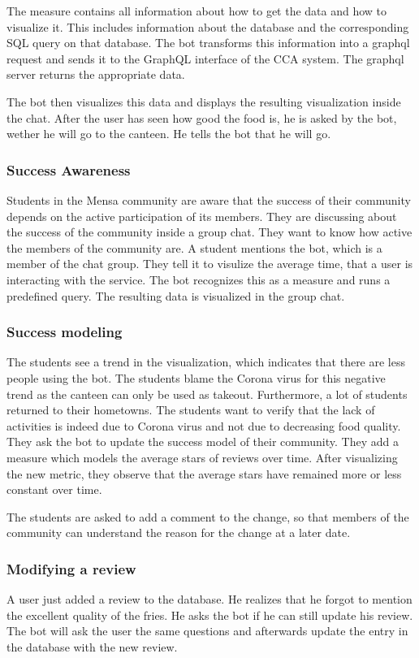 The measure contains all information about how to get the data and how to visualize it. This includes information about the database and the corresponding SQL query on that database. The bot transforms this information into a graphql request and sends it to the GraphQL interface of the CCA system. The graphql server returns the appropriate data.

The bot then visualizes this data and displays the  resulting visualization inside the chat.
After the user has seen how good the food is, he is asked by the bot, wether he will go to the canteen. He tells the bot that he will go.

\subsubsection{Success Awareness} Students in the Mensa community are aware that the success of their community depends on the active participation of its members. They are discussing about the success of the community inside a group chat. They want to know how active the members of the community are. A student mentions the bot, which is a member of the chat group. They tell it to visulize the average time, that a user is interacting with the service. The bot recognizes this as a measure and runs a predefined query. The resulting data is visualized in the group chat.

\subsubsection{Success modeling} The students see a trend in the visualization, which indicates that there are less people using the bot.
The students blame the Corona virus for this negative trend as the canteen can only be used as takeout. Furthermore, a lot of students returned to their hometowns.
The students want to verify that the lack of activities is indeed due to Corona virus and not due to decreasing food quality.
They ask the bot to update the success model of their community.
They add a measure which models the average stars of reviews over time.
After visualizing the new metric, they observe that the average stars have remained more or less constant over time.

The students are asked to add a comment to the change, so that members of the community can understand the reason for the change at a later date.


\subsubsection{Modifying a review} A user just added a review to the database. He realizes that he forgot to mention the excellent quality of the fries. 
He asks the bot if he can still update his review. The bot will ask the user the same questions and afterwards update the entry in the database with the new review.

